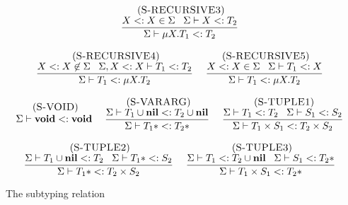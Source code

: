 \begin{figure}[!ht]
\begin{footnotesize}
$$\begin{array}{c}
\begin{array}{c}
\; (\textsc{S-RECURSIVE3})\\
\dfrac{X <: X \in \Sigma \;\;\;
       \Sigma \vdash X <: T_{2}}
      {\Sigma \vdash \mu X.T_{1} <: T_{2}}
\end{array}
\\ \\
\begin{array}{c}
\; (\textsc{S-RECURSIVE4})\\
\dfrac{X <: X \not\in \Sigma \;\;\;
       \Sigma, X <: X \vdash T_{1} <: T_{2}}
      {\Sigma \vdash T_{1} <: \mu X.T_{2}}
\end{array}
\;
\begin{array}{c}
\; (\textsc{S-RECURSIVE5})\\
\dfrac{X <: X \in \Sigma \;\;\;
       \Sigma \vdash T_{1} <: X}
      {\Sigma \vdash T_{1} <: \mu X.T_{2}}
\end{array}
\\ \\
\begin{array}{c}
\; (\textsc{S-VOID})\\
\Sigma \vdash \mathbf{void} <: \mathbf{void}
\end{array}
\;
\begin{array}{c}
\; (\textsc{S-VARARG})\\
\dfrac{\Sigma \vdash T_{1} \cup \mathbf{nil} <: T_{2} \cup \mathbf{nil}}
      {\Sigma \vdash T_{1}* <: T_{2}*}
\end{array}
\;
\begin{array}{c}
\; (\textsc{S-TUPLE1})\\
\dfrac{\Sigma \vdash T_{1} <: T_{2} \;\;\;
       \Sigma \vdash S_{1} <: S_{2}}
      {\Sigma \vdash T_{1} \times S_{1} <: T_{2} \times S_{2}}
\end{array}
\\ \\
\begin{array}{c}
\; (\textsc{S-TUPLE2})\\
\dfrac{\Sigma \vdash T_{1} \cup \mathbf{nil} <: T_{2} \;\;\;
       \Sigma \vdash T_{1}* <: S_{2}}
      {\Sigma \vdash T_{1}* <: T_{2} \times S_{2}}
\end{array}
\;
\begin{array}{c}
\; (\textsc{S-TUPLE3})\\
\dfrac{\Sigma \vdash T_{1} <: T_{2} \cup \mathbf{nil} \;\;\;
       \Sigma \vdash S_{1} <: T_{2}*}
      {\Sigma \vdash T_{1} \times S_{1} <: T_{2}*}
\end{array}
\end{array}
$$
\end{footnotesize}
\dend
\caption{The subtyping relation}
\label{fig:subtyping}
\end{figure}

